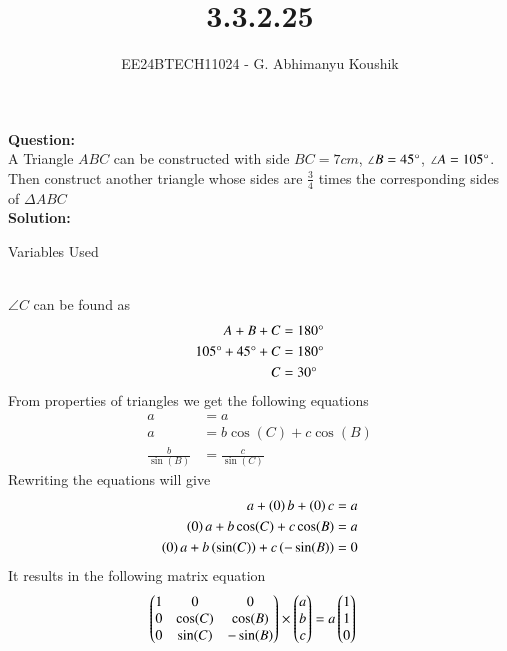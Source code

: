 \documentclass[journal]{IEEEtran}
\begin{document}

\vspace{3cm}

\title{3.3.2.25}
\author{EE24BTECH11024 - G. Abhimanyu Koushik
}
{\let\newpage\relax\maketitle}

\renewcommand{\thefigure}{\theenumi}
\renewcommand{\thetable}{\theenumi}
\setlength{\intextsep}{10pt} %

\textbf{Question:}\\
A Triangle $ABC$ can be constructed with side $BC=7cm$, $\angle B=45\degree$, $\angle A=105\degree$. Then construct another triangle whose sides are $\frac{3}{4}$ times the corresponding sides of $\Delta ABC$\\
\textbf{Solution:}
\begin{table}[h!]    
  \centering
  
  \caption{Variables Used}
  \label{tab10.5.3.9.1}
\end{table}\\
$\angle C$ can be found as 
\begin{align}
A+B+C&=180\degree\\
105\degree+45\degree+C&=180\degree\\
C&=30\degree
\end{align}
From properties of triangles we get the following equations
\begin{align}
a&=a\\
a&=b\cos(C)+c\cos(B)\\
\frac{b}{\sin(B)}&=\frac{c}{\sin(C)}
\end{align}
Rewriting the equations will give
\begin{align}
a+\left(0\right)b+\left(0\right)c&=a\\
\left(0\right)a+b\cos(C)+c\cos(B)&=a\\
\left(0\right)a+b\left(\sin(C)\right)+c\left(-\sin(B)\right)&=0
\end{align}
It results in the following matrix equation
\begin{align}
  \begin{pmatrix}1 & 0 & 0\\0 & \cos(C) & \cos(B)\\0 & \sin(C) & -\sin(B)\end{pmatrix}\times\begin{pmatrix}a\\b\\c\end{pmatrix}&=a\begin{pmatrix}1\\1\\0\end{pmatrix}
\end{align}
\end{document}
